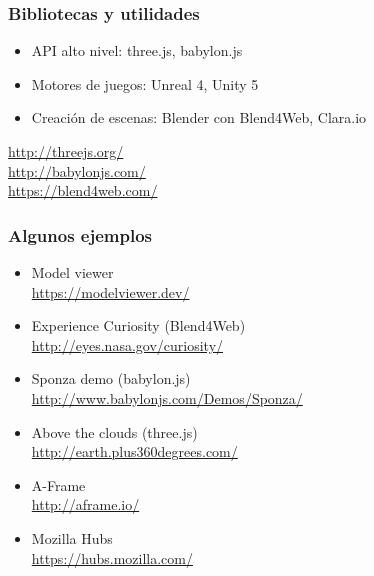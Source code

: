 \begin{frame}
\frametitle{Bibliotecas y utilidades}

{\Large
\begin{itemize}
\item API alto nivel: three.js, babylon.js
\item Motores de juegos: Unreal 4, Unity 5
\item Creación de escenas: Blender con Blend4Web, Clara.io
\end{itemize}
}
\vspace{1cm}
\begin{flushright}
  \url{http://threejs.org/} \\
  \url{http://babylonjs.com/} \\
  \url{https://blend4web.com/} \\
\end{flushright}
\end{frame}

\begin{frame}
\frametitle{Algunos ejemplos}

{\Large
  \begin{itemize}
    \item Model viewer \\
    \url{https://modelviewer.dev/} \\
  \item Experience Curiosity (Blend4Web)\\
    \url{http://eyes.nasa.gov/curiosity/} \\
  \item Sponza demo (babylon.js) \\
    \url{http://www.babylonjs.com/Demos/Sponza/} \\
  \item Above the clouds (three.js) \\
    \url{http://earth.plus360degrees.com/} \\
  \item A-Frame \\
    \url{http://aframe.io/} \\
  \item Mozilla Hubs \\
    \url{https://hubs.mozilla.com/}
  \end{itemize}
}

\end{frame}


